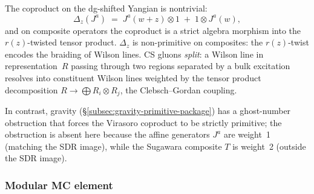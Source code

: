 The coproduct on the dg-shifted Yangian is nontrivial:
\begin{equation}\label{eq:cs-coproduct}
\Delta_z(J^a)
\;=\;
J^a(w+z) \otimes 1
\;+\;
1 \otimes J^a(w),
\end{equation}
and on composite operators the coproduct is a strict algebra morphism into the $r(z)$-twisted tensor product. $\Delta_z$ is non-primitive on composites: the $r(z)$-twist encodes the braiding of Wilson lines. CS gluons \emph{split}: a Wilson line in representation~$R$ passing through two regions separated by a bulk excitation resolves into constituent Wilson lines weighted by the tensor product decomposition $R \to \bigoplus R_i \otimes R_j$, the Clebsch--Gordan coupling.

In contrast, gravity (\S\ref{subsec:gravity-primitive-package}) has a ghost-number obstruction that forces the Virasoro coproduct to be strictly primitive; the obstruction is absent here because the affine generators $J^a$ are weight~1 (matching the SDR image), while the Sugawara composite $T$ is weight~2 (outside the SDR image).

\subsubsection*{Modular MC element}

